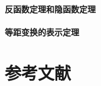 \documentclass[zihao=-4,linespread=1.5,heading=true,a4paper,twoside]{ctexart}
\begin{document}
\subsection{反函数定理和隐函数定理}


\subsection{等距变换的表示定理}


%



\newpage\part*{参考文献}
\printbibliography[heading=none]
\end{document}
